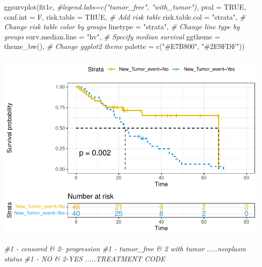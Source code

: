 \documentclass[
  11pt,
]{article}
\newenvironment{Shaded}{\begin{snugshade}}{\end{snugshade}}
\newcommand{\AttributeTok}[1]{\textcolor[rgb]{0.77,0.63,0.00}{#1}}
\newcommand{\CommentTok}[1]{\textcolor[rgb]{0.56,0.35,0.01}{\textit{#1}}}
\newcommand{\ConstantTok}[1]{\textcolor[rgb]{0.00,0.00,0.00}{#1}}
\newcommand{\FunctionTok}[1]{\textcolor[rgb]{0.00,0.00,0.00}{#1}}
\newcommand{\NormalTok}[1]{#1}
\newcommand{\StringTok}[1]{\textcolor[rgb]{0.31,0.60,0.02}{#1}}
\begin{document}
\begin{Shaded}
\begin{Highlighting}[]
\FunctionTok{ggsurvplot}\NormalTok{(fit1c,}
          \CommentTok{\#legend.labs=c("tumor\_free", "with\_tumor"),}
          \AttributeTok{pval =} \ConstantTok{TRUE}\NormalTok{, }\AttributeTok{conf.int =}\NormalTok{ F,}
          \AttributeTok{risk.table =} \ConstantTok{TRUE}\NormalTok{, }\CommentTok{\# Add risk table}
          \AttributeTok{risk.table.col =} \StringTok{"strata"}\NormalTok{, }\CommentTok{\# Change risk table color by groups}
          \AttributeTok{linetype =} \StringTok{"strata"}\NormalTok{, }\CommentTok{\# Change line type by groups}
          \AttributeTok{surv.median.line =} \StringTok{"hv"}\NormalTok{, }\CommentTok{\# Specify median survival}
          \AttributeTok{ggtheme =} \FunctionTok{theme\_bw}\NormalTok{(), }\CommentTok{\# Change ggplot2 theme}
          \AttributeTok{palette =} \FunctionTok{c}\NormalTok{(}\StringTok{"\#E7B800"}\NormalTok{, }\StringTok{"\#2E9FDF"}\NormalTok{))}
\end{Highlighting}
\end{Shaded}

\includegraphics{new_surv_2_files/figure-latex/unnamed-chunk-10-1.pdf}

\begin{Shaded}
\begin{Highlighting}[]
\CommentTok{\#1 {-} censored \& 2{-} progression}
\CommentTok{\#1 {-} tumor\_free \& 2 with tumor .....neoplasm status }
\CommentTok{\#1 {-} NO \& 2{-}YES .....TREATMENT CODE}
\end{Highlighting}
\end{Shaded}
\end{document}
